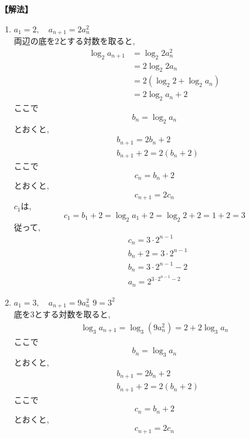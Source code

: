 \documentclass[dvipdfmx,a4paper,11pt,fleqn,openany]{jsbook}
\begin{document}
    \noindent\textbf{【解法】}
    \begin{enumerate}[label=(\arabic*),parsep=3pt]
      \item $\displaystyle a_1=2,\quad a_{n+1}=2a_n^2$\\
            両辺の底を$2$とする対数を取ると,
            \begin{align*}
              \log_2a_{n+1}
                &=\log_2{2a_n^2}\\
                &=2\log_2{2a_n}\\
                &=2(\log_2{2}+\log_2{a_n})\\
                &=2\log_2{a_n}+2
            \end{align*}
            ここで
            \[
              b_n=\log_2a_n
            \]
            とおくと,
            \begin{align*}
              &b_{n+1}=2b_n+2\\
              &b_{n+1}+2=2(b_n+2)
            \end{align*}
            ここで
            \[
              c_n=b_n+2
            \]
            とおくと,
            \[
              c_{n+1}=2c_n
            \]
            $c_1$は,
            \[
              c_1=b_1+2=\log_2{a_1}+2=\log_2{2}+2=1+2=3
            \]
            従って,
            \begin{align*}
              &c_n=3\cdot2^{n-1}\\
              &b_n+2=3\cdot2^{n-1}\\
              &b_n=3\cdot2^{n-1}-2\\
              &a_n=2^{3\cdot2^{n-1}-2}
            \end{align*}
      \item $\displaystyle a_1=3,\quad a_{n+1}=9a_n^2$
            $9=3^2$\\
            底を$3$とする対数を取ると,
            \begin{align*}
              \log_3a_{n+1}
                =\log_3(9a_n^2)=2+2\log_3a_n
            \end{align*}
            ここで
            \[
              b_n=\log_3a_n
            \]
            とおくと,
            \begin{align*}
              &b_{n+1}=2b_n+2\\
              &b_{n+1}+2=2(b_n+2)
            \end{align*}
            ここで
            \[
              c_n=b_n+2
            \]
            とおくと,
            \[
              c_{n+1}=2c_n
\]
\end{enumerate}
\end{document}

